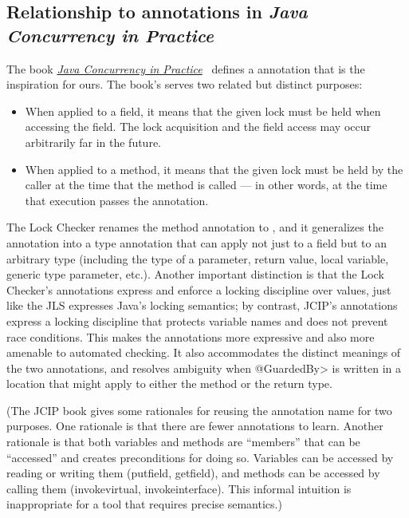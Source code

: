 \subsection{Relationship to annotations in \emph{Java Concurrency in Practice}\label{lock-jcip-annotations}}

The book \href{http://jcip.net/}{\emph{Java Concurrency in Practice}}~\cite{Goetz2006} defines a
\href{http://jcip.net.s3-website-us-east-1.amazonaws.com/annotations/doc/net/jcip/annotations/GuardedBy.html}{} annotation that is the inspiration for ours.  The book's
 serves two related but distinct purposes:

\begin{itemize}
\item
  When applied to a field, it means that the given lock must be held when
  accessing the field.  The lock acquisition and the field access may occur
  arbitrarily far in the future.
\item
  When applied to a method, it means that the given lock must be held by
  the caller at the time that the method is called --- in other words, at
  the time that execution passes the  annotation.
\end{itemize}

The Lock Checker renames the method annotation to
, and it generalizes the
 annotation into a type annotation
that can apply not just to a field but to an arbitrary type (including the
type of a parameter, return value, local variable, generic type parameter,
etc.).  Another important distinction is that the Lock Checker's
annotations express and enforce a locking discipline over values, just like
the JLS expresses Java's locking semantics; by contrast, JCIP's annotations
express a locking discipline that protects variable names and does not
prevent race conditions.
  This makes the annotations more expressive and also more amenable
to automated checking.  It also accommodates the distinct
meanings of the two annotations, and resolves ambiguity when \<@GuardedBy>
is written in a location that might apply to either the method or the
return type.

(The JCIP book gives some rationales for reusing the annotation name for
two purposes.  One rationale is
that there are fewer annotations to learn.  Another rationale is
that both variables and methods are ``members'' that can be ``accessed''
and  creates preconditions for doing so.
Variables can be accessed by reading or writing them (putfield, getfield),
and methods can be accessed by calling them (invokevirtual,
invokeinterface).  This informal intuition is
inappropriate for a tool that requires precise semantics.)

